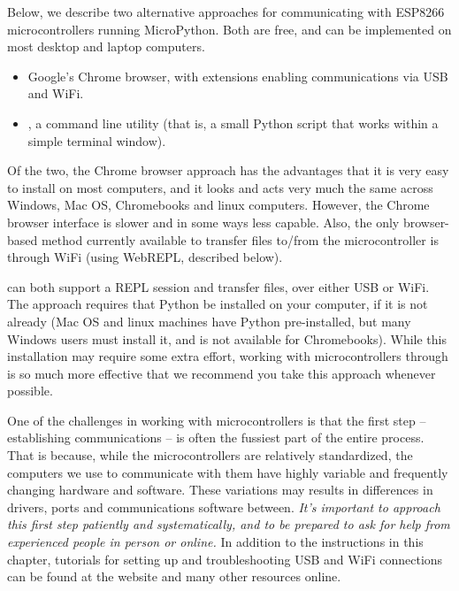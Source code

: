 Below, we describe two alternative approaches for communicating with  ESP8266 microcontrollers running MicroPython. Both are free, and can be implemented on most desktop and laptop computers. 
\begin{itemize}
	\item Google's Chrome browser, with extensions enabling communications via USB and WiFi. 
	\item \mpfshell, a command line utility (that is, a small Python script that works within a simple terminal window).
\end{itemize}
Of the two, the Chrome browser approach has the advantages that it is very easy to install on most computers, and it looks and acts very much the same across Windows, Mac OS, Chromebooks and linux computers. 
However, the Chrome browser interface is slower and in some ways less capable. 
Also, the only browser-based method currently available to transfer files to/from the microcontroller is through WiFi (using WebREPL, described below). 

\mpfshell can both support a REPL session and transfer files, over either USB or WiFi. 
The \mpfshell approach requires that Python be installed on your computer, if it is not already 
(Mac OS and linux machines have Python pre-installed, but many Windows users must install it, and \mpfshell is not available for Chromebooks). 
While this installation may require some extra effort, working with microcontrollers through \mpfshell is so much more effective that we recommend you take this approach whenever possible.


\begin{kaobox}[frametitle=As you get started \dots]
One of the challenges in working with microcontrollers is that the first step -- establishing communications -- is often the fussiest part of the entire process. 
That is because, while the microcontrollers are relatively standardized, the computers we use to communicate with them have highly variable and frequently changing hardware and software. 
These variations may results in differences in drivers, ports and communications software between. 
\emph{It's important to approach this first step patiently and systematically, and to be prepared to ask for help from experienced people in person or online.}
In addition to the instructions in this chapter, tutorials for setting up and troubleshooting USB and WiFi connections can be found at the  website and many other resources online.
\end{kaobox}


